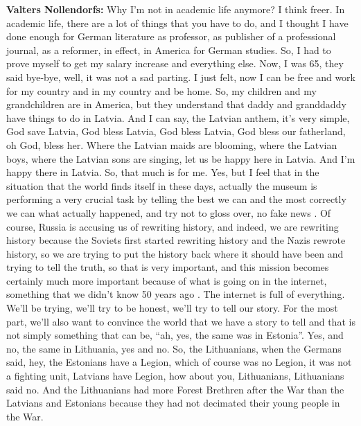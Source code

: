 \textbf{Valters Nollendorfs:} Why I'm not in academic life anymore? I think freer. In academic life, there are a lot of things that you have to do, and I thought I have done enough for German literature as professor, as publisher of a professional journal, as a reformer, in effect, in America for German studies. So, I had to prove myself to get my salary increase and everything else. Now, I was 65, they said bye-bye, well, it was not a sad parting. I just felt, now I can be free and work for my country and in my country and be home. So, my children and my grandchildren are in America, but they understand that daddy and granddaddy have things to do in Latvia. And I can say, the Latvian anthem, it’s very simple, God save Latvia, God bless Latvia, God bless Latvia, God bless our fatherland, oh God, bless her. Where the Latvian maids are blooming, where the Latvian boys, where the Latvian sons are singing, let us be happy here in Latvia. And I'm happy there in Latvia. So, that much is for me. Yes, but I feel that in the situation that the world finds itself in these days, actually the museum is performing a very crucial task by telling the best we can and the most correctly we can what actually happened, and try not to gloss over, no fake news . Of course, Russia is accusing us of rewriting history, and indeed, we are rewriting history because the Soviets first started rewriting history and the Nazis rewrote history, so we are trying to put the history back where it should have been and trying to tell the truth, so that is very important, and this mission becomes certainly much more important because of what is going on in the internet, something that we didn’t know 50 years ago . The internet is full of everything. We’ll be trying, we’ll try to be honest, we’ll try to tell our story. For the most part, we’ll also want to convince the world that we have a story to tell and that is not simply something that can be, “ah, yes, the same was in Estonia”. Yes, and no, the same in Lithuania, yes and no. So, the Lithuanians, when the Germans said, hey, the Estonians have a Legion, which of course was no Legion, it was not a fighting unit, Latvians have Legion, how about you, Lithuanians, Lithuanians said no. And the Lithuanians had more Forest Brethren after the War than the Latvians and Estonians because they had not decimated their young people in the War. 
